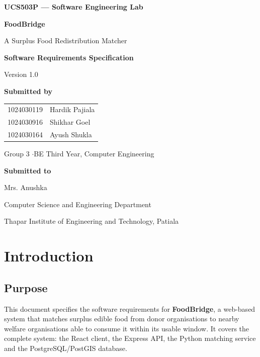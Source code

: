 \documentclass[11pt,a4paper]{article}
\begin{document}
\begin{titlepage}
\centering
\vspace*{2.5cm}
{\Large\bfseries UCS503P --- Software Engineering Lab\par}
\vspace{2cm}
{\Huge\bfseries FoodBridge\par}
\vspace{0.5cm}
{\Large A Surplus Food Redistribution Matcher\par}
\vspace{1cm}
{\LARGE\bfseries Software Requirements Specification\par}
\vspace{0.4cm}
{\large Version 1.0\par}
\vspace{2.5cm}
{\large\bfseries Submitted by\par}
\vspace{0.4cm}
\begin{tabular}{ll}
1024030119 & Hardik Pajiala \\
1024030916 & Shikhar Goel \\
1024030164 & Ayush Shukla \\
\end{tabular}

\vspace{0.4cm}
{Group 3 \quad$\cdot$\quad BE Third Year, Computer Engineering}

\vspace{2cm}
{\large\bfseries Submitted to\par}
\vspace{0.3cm}
{\large Mrs. Anushka\par}
\vfill
{Computer Science and Engineering Department\par}
{Thapar Institute of Engineering and Technology, Patiala\par}
\end{titlepage}

\tableofcontents
\newpage

\section{Introduction}

\subsection{Purpose}
This document specifies the software requirements for \textbf{FoodBridge}, a
web-based system that matches surplus edible food from donor organisations to
nearby welfare organisations able to consume it within its usable window. It
covers the complete system: the React client, the Express API, the Python
matching service and the PostgreSQL/PostGIS database.
\end{document}
